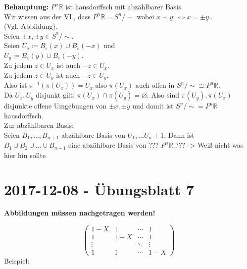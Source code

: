 \begin{problem*}[3b]
\textbf{Behauptung:} $ P^n\mathbb{R}$ ist hausdorffsch mit abzählbarer Basis.\\
Wir wissen aus der VL, dass $ P^n\mathbb{R} = S^n / \sim $ wobei $x \sim y :\Leftrightarrow x = \pm y.$.\\
(Vgl. Abbildung). \\
Seien $\pm x, \pm y \in S^2 / \sim $. \\
Seien $U_x \coloneqq B_\varepsilon(x) \cup B_\varepsilon(-x)$ und \\
$U_y \coloneqq B_\varepsilon(y) \cup B_\varepsilon(-y)$.\\
Zu jedem $ z \in U_x$ ist auch $-z \in U_x$.\\
Zu jedem $ z \in U_y$ ist auch $-z \in U_y$.\\
Also ist $\pi^{ -1 } (\pi(U_x)) = U_x$ also $\pi(U_x)$ auch offen in $S^n / \sim \cong P^n\mathbb{R} $.\\
Da $U_x, U_y$ disjunkt gilt: $\pi(U_x) \cap \pi(U_y) = \varnothing$. Also sind $\pi(U_y), \pi(U_x)$ disjunkte offene Umgebungen von $\pm x, \pm y$ und damit ist $S^n / \sim = P^n\mathbb{R} $ hausdorffsch.\\
Zur abzählbaren Basis: \\
Seien $B_1, \dots, B_{ n+1 }$ abzählbare Basis von $U_1, \dots U_n+1$. Dann ist $ B_1 \cup B_2 \cup \dots \cup B_{ n+1 }$ eine abzählbare Basis von ??? $P^n\mathbb{R}$ ??? -> Weiß nicht was hier hin sollte



\end{problem*}

\newpage
\section{2017-12-08 - Übungsblatt 7} %
\label{sub:2017_12_08}

\textbf{Abbildungen müssen nachgetragen werden!}

\begin{problem*}[Template]

\begin{equation*}
  \begin{pmatrix}
  1-X     & 1       & \cdots  &  1 \\
  1       & 1 - X   & \cdots  &  1 \\
  \vdots  &         & \ddots  & \vdots \\
  1       & 1       & \cdots  & 1-X 
    
  \end{pmatrix}
\end{equation*}
Beispiel:


\end{problem*}

